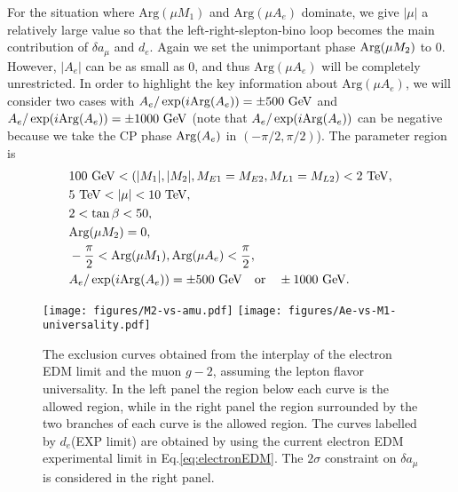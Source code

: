 \documentclass[a4paper,11pt]{article}
\begin{document}
   For the situation where $\text{Arg}(\mu M_1)$ and $\text{Arg}(\mu A_e)$ dominate,
   we give $|\mu|$ a relatively large value so that the left-right-slepton-bino loop becomes the main contribution of $\delta a_\mu$ and $d_e$. Again we set the unimportant phase ${\rm Arg}(\mu M_2)$ to 0.  However, $|A_e|$ can be as small as 0, and thus $\text{Arg}(\mu A_e)$ will be completely unrestricted. In order to highlight the key information about $\text{Arg}(\mu A_e)$, we will consider two cases with $A_e/\exp(i{\rm Arg}(A_e))=\pm 500~{\rm GeV}$ and $A_e/\exp(i{\rm Arg}(A_e))=\pm 1000~{\rm GeV}$ (note that $A_e/\exp(i{\rm Arg}(A_e))$ can be negative because we take the CP phase ${\rm Arg}(A_e)$ in $(-\pi/2,\pi/2)$). The parameter region is
   \begin{align*}
       &100~\text{GeV}<(|M_1|,|M_2|,M_{E1}=M_{E2},M_{L1}=M_{L2})<2~\text{TeV},\\
       &5~\text{TeV}<|\mu|<10~\text{TeV},\\
       &2<\tan\beta <50,\\
       &\text{Arg}(\mu M_2)=0,\\
       &-\frac{\pi}{2} < \text{Arg}(\mu M_1),\text{Arg}(\mu A_e)<\frac{\pi}{2},\\
       &A_e/\exp(i{\rm Arg}(A_e))=\pm 500~{\rm GeV}\quad \text{or}\quad \pm1000~{\rm GeV}.
   \end{align*}
   
   \begin{figure}[ht]
      \centering %
      \texttt{[image: figures/M2-vs-amu.pdf]}
      \hfill
      \texttt{[image: figures/Ae-vs-M1-universality.pdf]}
      \caption{\label{fig:universality} 
      The exclusion curves obtained from the interplay of the electron EDM limit and the muon $g-2$, assuming the lepton flavor universality. In the left panel the region below each curve is the allowed region, while in the right panel the region surrounded by the two branches of each curve is the allowed region. The curves labelled by $d_e$(EXP limit) are obtained by using the current electron EDM experimental limit in Eq.\eqref{eq:electronEDM}. The $2\sigma$ constraint on $\delta a_\mu$ is considered in the right panel. }
   \end{figure}
   
\end{document}
